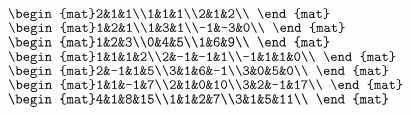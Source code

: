 \begin{Exercise}[
name={},
title={}, 
difficulty=0,
origin={\cite{GH}}]
\begin{multicols}{3}
\Question $\begin{mat}2&1&1\\1&1&1\\2&1&2\\ \end{mat}$
\Question $\begin{mat}1&2&1\\1&3&1\\-1&-3&0\\ \end{mat}$
\Question $\begin{mat}1&2&3\\0&4&5\\1&6&9\\ \end{mat}$
\Question $\begin{mat}1&1&1&2\\2&-1&-1&1\\-1&1&1&0\\ \end{mat}$
\Question $\begin{mat}2&-1&1&5\\3&1&6&-1\\3&0&5&0\\ \end{mat}$
\Question $\begin{mat}1&1&-1&7\\2&1&0&10\\3&2&-1&17\\ \end{mat}$
\Question $\begin{mat}4&1&8&15\\1&1&2&7\\3&1&5&11\\ \end{mat}$
\EndCurrentQuestion
\end{multicols}
\end{Exercise}


